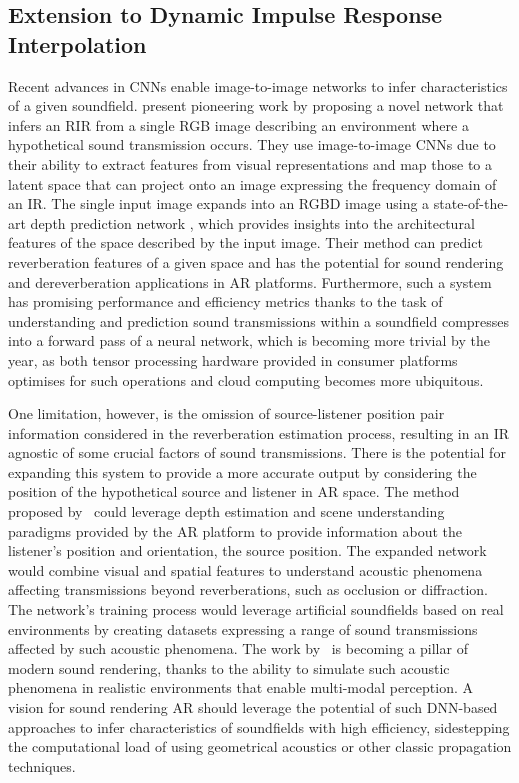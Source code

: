 \subsection{Extension to Dynamic Impulse Response Interpolation}\label{sec:dynamic-rir-expansion}
Recent advances in CNNs enable image-to-image networks to infer characteristics of a given soundfield. \cite{Singh_2021_ICCV} present pioneering work by proposing a novel network that infers an RIR from a single RGB image describing an environment where a hypothetical sound transmission occurs. They use image-to-image CNNs due to their ability to extract features from visual representations and map those to a latent space that can project onto an image expressing the frequency domain of an IR. The single input image expands into an RGBD image using a state-of-the-art depth prediction network \citep{bauer2021nvs}, which provides insights into the architectural features of the space described by the input image. Their method can predict reverberation features of a given space and has the potential for sound rendering and dereverberation applications in AR platforms. Furthermore, such a system has promising performance and efficiency metrics thanks to the task of understanding and prediction sound transmissions within a soundfield compresses into a forward pass of a neural network, which is becoming more trivial by the year, as both tensor processing hardware provided in consumer platforms optimises for such operations and cloud computing becomes more ubiquitous.\par
One limitation, however, is the omission of source-listener position pair information considered in the reverberation estimation process, resulting in an IR agnostic of some crucial factors of sound transmissions. There is the potential for expanding this system to provide a more accurate output by considering the position of the hypothetical source and listener in AR space. The method proposed by~\cite{Singh_2021_ICCV} could leverage depth estimation and scene understanding paradigms provided by the AR platform to provide information about the listener's position and orientation, the source position. The expanded network would combine visual and spatial features to understand acoustic phenomena affecting transmissions beyond reverberations, such as occlusion or diffraction. The network's training process would leverage artificial soundfields based on real environments by creating datasets expressing a range of sound transmissions affected by such acoustic phenomena. The work by~\cite{chen2022soundspaces} is becoming a pillar of modern sound rendering, thanks to the ability to simulate such acoustic phenomena in realistic environments that enable multi-modal perception. A vision for sound rendering AR should leverage the potential of such DNN-based approaches to infer characteristics of soundfields with high efficiency, sidestepping the computational load of using geometrical acoustics or other classic propagation techniques.\par

